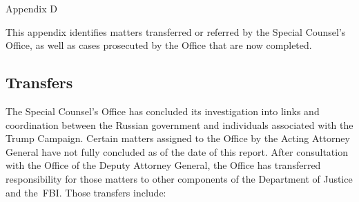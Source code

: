 
\thispagestyle{empty}

\vspace*{15em}

\begin{center}

\Huge
Appendix D

\end{center}

\newpage

This appendix identifies matters transferred or referred by the Special Counsel's Office, as well as cases prosecuted by the Office that are now completed.

\subsection{Transfers}

The Special Counsel's Office has concluded its investigation into links and coordination between the Russian government and individuals associated with the Trump Campaign.
Certain matters assigned to the Office by the Acting Attorney General have not fully concluded as of the date of this report.
After consultation with the Office of the Deputy Attorney General, the Office has transferred responsibility for those matters to other components of the Department of Justice and the~FBI\null.
Those transfers include:

